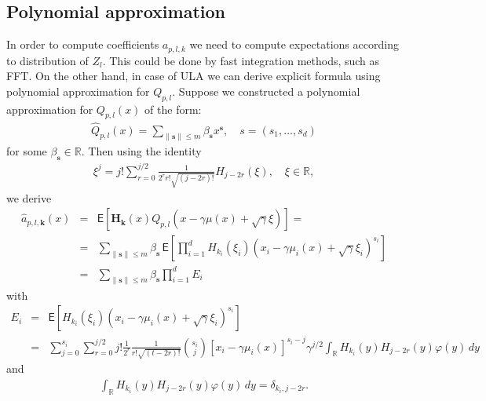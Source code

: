 \documentclass[a4paper]{article}
\begin{document}
\subsection{Polynomial approximation}
In order to compute coefficients $a_{p,l,k}$ we need to compute expectations according to distribution of $Z_l$. This could be done by fast integration methods, such as FFT. On the other hand, in case of ULA we can derive explicit formula using polynomial approximation for $Q_{p,l}$.
Suppose we constructed a polynomial approximation  for \(Q_{p,l}(x) \)  of the form:
\begin{eqnarray*}
\widehat Q_{p,l}(x) = \sum_{\|\mathbf{s}\|\leq m} \beta_{\mathbf{s}} x^{\mathbf{s}},\quad s=(s_1,\ldots,s_d)
\end{eqnarray*}
for some \(\beta_{\mathbf{s}}\in \mathbb{R}.\)
Then using the identity
\begin{eqnarray*}
\xi^j = j! \sum_{r = 0}^{j/2} \frac{1}{2^r  r! \sqrt{(j-2r)!}} H_{j-2r}(\xi),\quad \xi \in \mathbb{R},
\end{eqnarray*}
we derive
\begin{eqnarray*}
\widehat a_{p,l,\mathbf{k}} (x) &=&\mathsf{E} \left[ \mathbf{H}_\mathbf{k}(x) Q_{p,l}(x - \gamma \mu(x) + \sqrt{\gamma}\xi)\right] =
\\
&=&\sum_{\|\mathbf{s}\|\leq m} \beta_{\mathbf{s}} \,\mathsf{E} \left[ \prod_{i=1}^d H_{k_i}(\xi_i) (x_i - \gamma \mu_i(x) + \sqrt{\gamma} \xi_i)^{s_i} \right]
\\
&=& \sum_{\|\mathbf{s}\|\leq m} \beta_{\mathbf{s}} \prod_{i=1}^d E_i
\end{eqnarray*}
with
\begin{eqnarray*}
E_i &=& \mathsf{E} \left[ H_{k_i}(\xi_i) (x_i - \gamma \mu_i(x) + \sqrt{\gamma} \xi_i)^{s_i} \right]
\\
& = & \sum_{j=0}^{s_i} \sum_{r= 0}^{ j/2} j! \frac{1}{2^r} \frac{1}{r! \sqrt{(t-2r)!}} \binom{s_i}{j} \left[ x_i - \gamma \mu_i(x) \right]^{s_i-j} \gamma^{j/2} \int_{\mathbb{R}} H_{k_i}(y) H_{j - 2r}(y) \varphi(y)\, d y
\end{eqnarray*}
and
\begin{eqnarray*}
\int_{\mathbb{R}} H_{k_i}(y) H_{j - 2r}(y) \varphi(y)\, d y = \delta_{k_i, j-2r}.
\end{eqnarray*}
\end{document}
